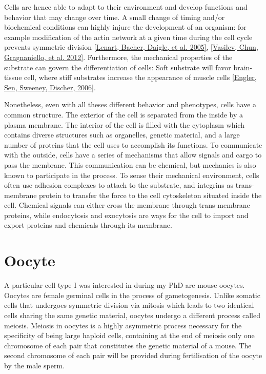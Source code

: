 \documentclass[A4paperpaper,11pt,english]{sphinxmanual}
\begin{document}
Cells are hence able to adapt to their environment and develop functions and
behavior that may change over time. A small change of timing and/or biochemical
conditions can highly injure the development of an organism: for example modification of
the actin network at a given time during the cell cycle prevents symmetric division
{\hyperref[index-latex:lenart2005]{{[}Lenart, Bacher, Daigle,  et al.  2005{]}}}, {\hyperref[index-latex:vasilev2012]{{[}Vasilev, Chun, Gragnaniello,  et al.  2012{]}}}. Furthermore, the mechanical properties of the substrate can
govern the differentiation of cells: Soft substrate will favor brain-tissue
cell, where stiff substrates increase the appearance of muscle cells
{\hyperref[index-latex:engler2006]{{[}Engler, Sen, Sweeney, Discher,  2006{]}}}.

Nonetheless, even with all theses different behavior and phenotypes, cells
have a common structure. The exterior of the cell is separated from the
inside by a plasma membrane. The interior of the cell is filled with the cytoplasm
which contains diverse structures such as organelles, genetic material, and
a large number of proteins that the cell uses to accomplish its functions. To
communicate with the outside, cells have a series of mechanisms that allow signals
and cargo to pass the membrane. This communication can be chemical, but
mechanics is also known to participate in the process. To sense their
mechanical environment, cells often use adhesion complexes to attach to the
substrate, and integrins as trans-membrane protein to transfer the force to the
cell cytoskeleton situated inside the cell. Chemical signals can either cross
the membrane through trans-membrane proteins, while endocytosis and exocytosis are
ways for the cell to import and export proteins and chemicals through its membrane.


\section{Oocyte}
\label{index-latex:oocyte}
A particular cell type I was interested in during my PhD are mouse oocytes.
Oocytes are female germinal cells in the process of gametogenesis. Unlike
somatic cells that undergoes symmetric division via mitosis which leads to
two identical cells sharing the same genetic material, oocytes undergo a
different process called meiosis.  Meiosis in oocytes is a highly asymmetric
process necessary for the specificity of being large haploid
cells, containing at the end of meiosis only one chromosome of each pair
that constitutes the genetic material of a mouse. The second chromosome of each pair
will be provided during fertilisation of the oocyte by the male sperm.
\end{document}
